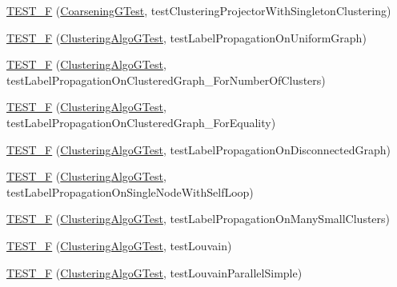 \begin{DoxyCompactItemize}
\item 
\hyperlink{namespace_ensemble_clustering_acd164cf674958247ab7b79e4c5cb8995}{T\-E\-S\-T\-\_\-\-F} (\hyperlink{class_ensemble_clustering_1_1_coarsening_g_test}{Coarsening\-G\-Test}, test\-Clustering\-Projector\-With\-Singleton\-Clustering)
\item 
\hyperlink{namespace_ensemble_clustering_aaffbc51fe940b36b5fdb55c69e2c8d72}{T\-E\-S\-T\-\_\-\-F} (\hyperlink{class_ensemble_clustering_1_1_clustering_algo_g_test}{Clustering\-Algo\-G\-Test}, test\-Label\-Propagation\-On\-Uniform\-Graph)
\item 
\hyperlink{namespace_ensemble_clustering_a2c13ac9a0472a8bc6555bcbb2e82e24a}{T\-E\-S\-T\-\_\-\-F} (\hyperlink{class_ensemble_clustering_1_1_clustering_algo_g_test}{Clustering\-Algo\-G\-Test}, test\-Label\-Propagation\-On\-Clustered\-Graph\-\_\-\-For\-Number\-Of\-Clusters)
\item 
\hyperlink{namespace_ensemble_clustering_ae379b062f7e765e5a47e2506270a2347}{T\-E\-S\-T\-\_\-\-F} (\hyperlink{class_ensemble_clustering_1_1_clustering_algo_g_test}{Clustering\-Algo\-G\-Test}, test\-Label\-Propagation\-On\-Clustered\-Graph\-\_\-\-For\-Equality)
\item 
\hyperlink{namespace_ensemble_clustering_a525d7aef7bf460dbd0c66f5d1b61ae99}{T\-E\-S\-T\-\_\-\-F} (\hyperlink{class_ensemble_clustering_1_1_clustering_algo_g_test}{Clustering\-Algo\-G\-Test}, test\-Label\-Propagation\-On\-Disconnected\-Graph)
\item 
\hyperlink{namespace_ensemble_clustering_a8a456be1b5fc5bbca0f82183ed81c7fc}{T\-E\-S\-T\-\_\-\-F} (\hyperlink{class_ensemble_clustering_1_1_clustering_algo_g_test}{Clustering\-Algo\-G\-Test}, test\-Label\-Propagation\-On\-Single\-Node\-With\-Self\-Loop)
\item 
\hyperlink{namespace_ensemble_clustering_a4b2b93a72e956494d5b9dd977b4865f9}{T\-E\-S\-T\-\_\-\-F} (\hyperlink{class_ensemble_clustering_1_1_clustering_algo_g_test}{Clustering\-Algo\-G\-Test}, test\-Label\-Propagation\-On\-Many\-Small\-Clusters)
\item 
\hyperlink{namespace_ensemble_clustering_a2f74c33ac5a4a07757b76a086cf2e66c}{T\-E\-S\-T\-\_\-\-F} (\hyperlink{class_ensemble_clustering_1_1_clustering_algo_g_test}{Clustering\-Algo\-G\-Test}, test\-Louvain)
\item 
\hyperlink{namespace_ensemble_clustering_ad84888a01dfac7b1948ddd0994ee2043}{T\-E\-S\-T\-\_\-\-F} (\hyperlink{class_ensemble_clustering_1_1_clustering_algo_g_test}{Clustering\-Algo\-G\-Test}, test\-Louvain\-Parallel\-Simple)
\item 

\end{DoxyCompactItemize}
